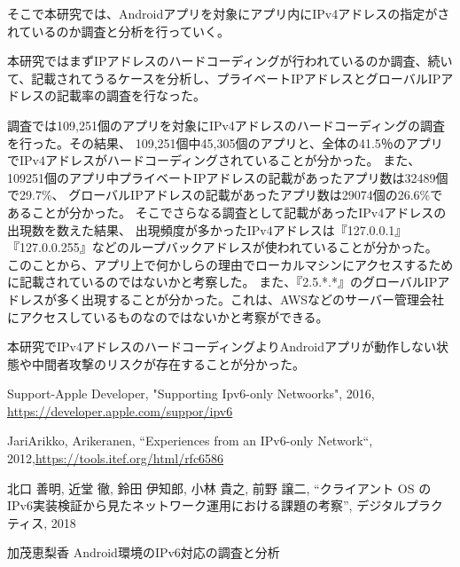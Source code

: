 \documentclass[twocolumn, 10pt, a4paper]{jarticle}
\begin{document}
そこで本研究では、Androidアプリを対象にアプリ内にIPv4アドレスの指定がされているのか調査と分析を行っていく。

本研究ではまずIPアドレスのハードコーディングが行われているのか調査、続いて、記載されてうるケースを分析し、プライベートIPアドレスとグローバルIPアドレスの記載率の調査を行なった。


調査では109,251個のアプリを対象にIPv4アドレスのハードコーディングの調査を行った。その結果、
109,251個中45,305個のアプリと、全体の41.5％のアプリでIPv4アドレスがハードコーディングされていることが分かった。
また、109251個のアプリ中プライベートIPアドレスの記載があったアプリ数は32489個で29.7\%、
グローバルIPアドレスの記載があったアプリ数は29074個の26.6\%であることが分かった。
そこでさらなる調査として記載があったIPv4アドレスの出現数を数えた結果、
出現頻度が多かったIPv4アドレスは『127.0.0.1』『127.0.0.255』などのループバックアドレスが使われていることが分かった。
このことから、アプリ上で何かしらの理由でローカルマシンにアクセスするために記載されているのではないかと考察した。
また、『2.5.*.*』のグローバルIPアドレスが多く出現することが分かった。これは、AWSなどのサーバー管理会社にアクセスしているものなのではないかと考察ができる。

本研究でIPv4アドレスのハードコーディングよりAndroidアプリが動作しない状態や中間者攻撃のリスクが存在することが分かった。



\begin{thebibliography}{20}

Support-Apple Developer, "Supporting Ipv6-only Netwoorks", 2016, \url{https://developer.apple.com/suppor/ipv6}

JariArikko, Arikeranen, “Experiences from an IPv6-only Network“, 2012,\url{https://tools.itef.org/html/rfc6586}

北口 善明, 近堂 徹, 鈴田 伊知郎, 小林 貴之, 前野 譲二, “クライアント OS の IPv6実装検証から見たネットワーク運用における課題の考察”, デジタルプラクティス, 2018

加茂恵梨香 Android環境のIPv6対応の調査と分析

\end{thebibliography}
\end{document}
